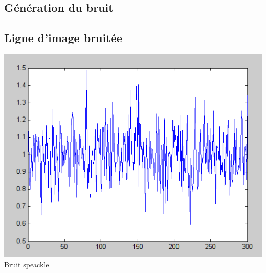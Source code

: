 \documentclass{beamer}
\newcommand{\FSource}[1]{%
  
  }
\begin{document}
\begin{frame}
\subsection{Génération du bruit}
\FSource{matlab/A.m}
\end{frame}


\begin{frame}
\subsection{Ligne d'image bruitée}
\begin{center}
\includegraphics[scale=0.5]{capture/B.png}\\
Bruit speackle
\end{center}
\end{frame}

\end{document}
